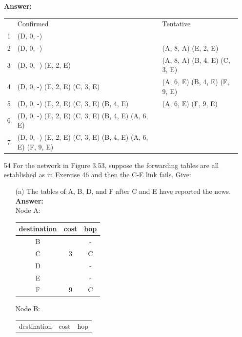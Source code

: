 \documentclass[a4paper]{article}
\begin{document}
\begin{itemize}
	      \textbf{Answer:} \\
	      \begin{tabular}{cll}
	      	  & Confirmed                                                   & Tentative                     \\
	      	1 & (D, 0, -)                                                   &                               \\
	      	2 & (D, 0, -)                                                   & (A, 8, A) (E, 2, E)           \\
	      	3 & (D, 0, -) (E, 2, E)                                         & (A, 8, A) (B, 4, E) (C, 3, E) \\
	      	4 & (D, 0, -) (E, 2, E) (C, 3, E)                               & (A, 6, E) (B, 4, E) (F, 9, E) \\
	      	5 & (D, 0, -) (E, 2, E) (C, 3, E) (B, 4, E)                     & (A, 6, E) (F, 9, E)           \\
	      	6 & (D, 0, -) (E, 2, E) (C, 3, E) (B, 4, E) (A, 6, E)           &                               \\
	      	7 & (D, 0, -) (E, 2, E) (C, 3, E) (B, 4, E) (A, 6, E) (F, 9, E) &                               \\
	      \end{tabular}
	\item[54] For the network in Figure 3.53, suppose the forwarding tables are all established as in Exercise 46 and then the C-E link fails. Give:
	      \begin{itemize}
	      	\item[(a)] The tables of A, B, D, and F after C and E have reported the news. \\
	      	      \textbf{Answer:} \\
	      	      Node A: \begin{tabular}{c|c|c}
	      	      destination & cost & hop \\
	      	      \hline
	      	      B & & - \\
	      	      C & 3 & C \\
	      	      D & & - \\
	      	      E & & - \\
	      	      F & 9 & C \\
	      	\end{tabular}
	      	Node B: \begin{tabular}{c|c|c}
	      	destination & cost & hop \\

\end{tabular}
\end{itemize}
\end{itemize}
\end{document}
